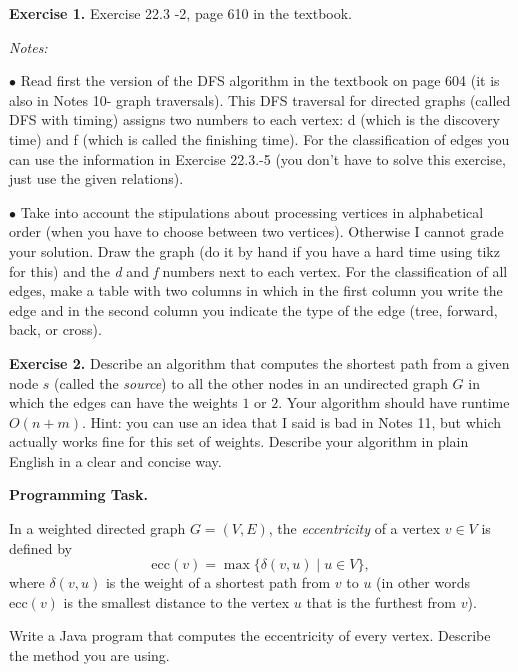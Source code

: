 \documentclass[11pt]{article}
\begin{document}
\newpage







\textbf{Exercise 1.}
Exercise 22.3 -2, page 610 in the textbook.
\medskip

\emph{Notes:} 

$\bullet$ Read first the version of the  DFS algorithm in the textbook on page 604 (it is also in Notes 10- graph traversals). This DFS traversal for directed graphs (called DFS with timing) assigns two numbers to each vertex: d (which is the discovery time) and f (which is called the finishing time). For the classification of edges you can use the information in Exercise 22.3.-5 (you don't have to solve this exercise, just use the given relations).

$\bullet$ Take into account the stipulations about processing vertices in alphabetical order (when you have to choose between two vertices). Otherwise I cannot grade your solution.   Draw the graph (do it by hand if you have  a hard time using tikz for this) and the \emph{d} and \emph{f} numbers next to each vertex. For the classification of all edges,  make  a table with two columns in which in the first column you write the edge and in the second column you indicate the type of the edge (tree, forward, back, or cross).
 \bigskip

\textbf{Exercise 2.}  Describe  an algorithm that computes the shortest path from a given node $s$ (called the \emph{source}) to all the other nodes in an undirected graph $G$  in which the edges can have the weights $1$ or $2$.  Your algorithm should have runtime $O(n+m)$. Hint: you can use an idea that I said is bad  in Notes 11, but which actually  works fine for this set of weights. Describe your algorithm in plain English in a clear and concise way.




\bigskip


\textbf{Programming Task.}


In a weighted directed graph $G=(V,E)$, the \emph{eccentricity} of a vertex $v \in V$ is defined by
\[
\textrm{ecc}(v) = \max \{\delta(v,u) \mid u \in V\},
\]
where $\delta(v,u)$ is the weight of a shortest path from $v$ to $u$ (in other words $\textrm{ecc}(v)$ is the smallest distance to the vertex $u$ that is the furthest from $v$).

Write a Java program that computes the eccentricity of every vertex. Describe the method you are using.
\end{document}
